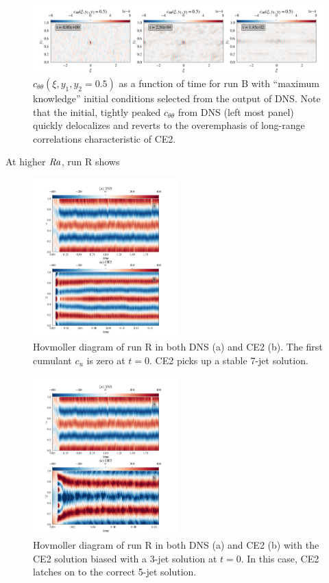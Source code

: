 \documentclass{jfm}
\newcommand{\cu}{c_u}
\newcommand{\ctt}{c_{\theta \theta}}
\newcommand{\Rayleigh}{\mbox{\textit{Ra}}}  %
\begin{document}
\begin{figure}
    \centering
    \includegraphics[width=\textwidth]{../../figs/run_B_decoherence.pdf}
    \caption{$\ctt(\xi, y_1, y_2 = 0.5)$ as a function of time for run B with ``maximum knowledge'' initial conditions selected from the output of DNS. Note that the initial, tightly peaked $\ctt$ from DNS (left most panel) quickly delocalizes and reverts to the overemphasis of long-range correlations characteristic of CE2.}
    \label{fig:run_B_decoherence}
\end{figure}
At higher $\Rayleigh$, run R shows 
\begin{figure}
  \centering
  \includegraphics[width=0.5\textwidth]{../../figs/hov_cu_dns_ce2_run_R.pdf}
  \caption{Hovmoller diagram of run R in both DNS (a) and CE2 (b). The first cumulant $\cu$ is zero at $t = 0$. CE2 picks up a stable 7-jet solution.}
  \label{fig:hov_run_R}
\end{figure}
\begin{figure}
  \centering
  \includegraphics[width=0.5\textwidth]{../../figs/hov_cu_dns_ce2_run_S.pdf}
  \caption{Hovmoller diagram of run R in both DNS (a) and CE2 (b) with the CE2 solution biased with a 3-jet solution at $t=0$. In this case, CE2 latches on to the correct 5-jet solution.}
   \label{fig:hov_run_S}
\end{figure}
\end{document}
